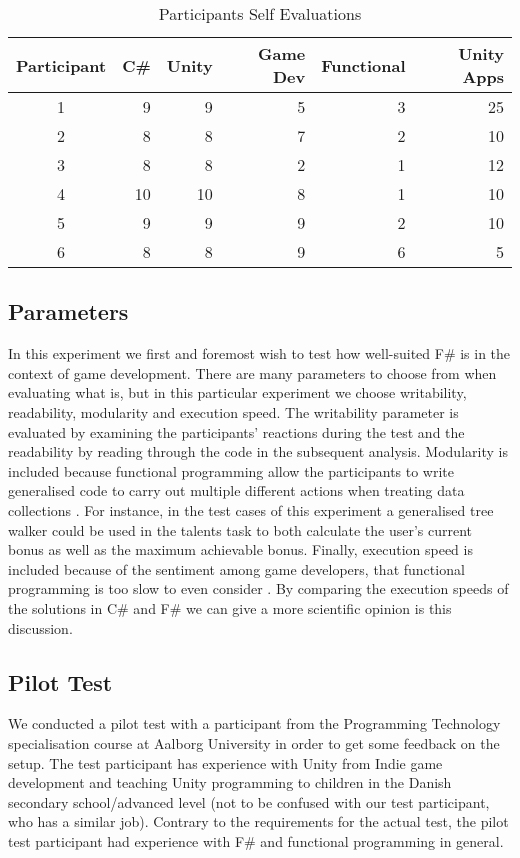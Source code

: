 \begin{table}[H]
\begin{tabular}{| c | r | r | r | r | r |}
	\hline
	\textbf{Participant}&\textbf{C\#}&\textbf{Unity}&\textbf{Game Dev}&\textbf{Functional}&\textbf{Unity Apps} \\ \hline
	1 & 9 & 9 & 5 & 3 & 25 \\ \hline
	2 & 8 & 8 & 7 & 2 & 10 \\ \hline
	3 & 8 & 8 & 2 & 1 & 12 \\ \hline
	4 & 10 & 10 & 8 & 1 & 10 \\ \hline
	5 & 9 & 9 & 9 & 2 & 10 \\ \hline
	6 & 8 & 8 & 9 & 6 & 5 \\ \hline
\end{tabular}
\caption{Participants Self Evaluations}
\label{tab:participant-scores}
\end{table}

\subsection{Parameters}
In this experiment we first and foremost wish to test how well-suited F\# is in the context of game development. There are many parameters to choose from when evaluating what \textit{} is, but in this particular experiment we choose writability, readability, modularity and execution speed. The writability parameter is evaluated by examining the participants' reactions during the test and the readability by reading through the code in the subsequent analysis. Modularity is included because functional programming allow the participants to write generalised code to carry out multiple different actions when treating data collections \cite{hughes1989functional}. For instance, in the test cases of this experiment a generalised tree walker could be used in the talents task to both calculate the user's current bonus as well as the maximum achievable bonus. Finally, execution speed is included because of the sentiment among game developers, that functional programming is too slow to even consider \cite{pop:functional:slow, pop:functional:sucks}. By comparing the execution speeds of the solutions in C\# and F\# we can give a more scientific opinion is this discussion.

\subsection{Pilot Test}
We conducted a pilot test with a participant from the Programming Technology specialisation course at Aalborg University in order to get some feedback on the setup. The test participant has experience with Unity from Indie game development and teaching Unity programming to children in the Danish secondary school/advanced level (not to be confused with our test participant, who has a similar job). Contrary to the requirements for the actual test, the pilot test participant had experience with F\# and functional programming in general.

